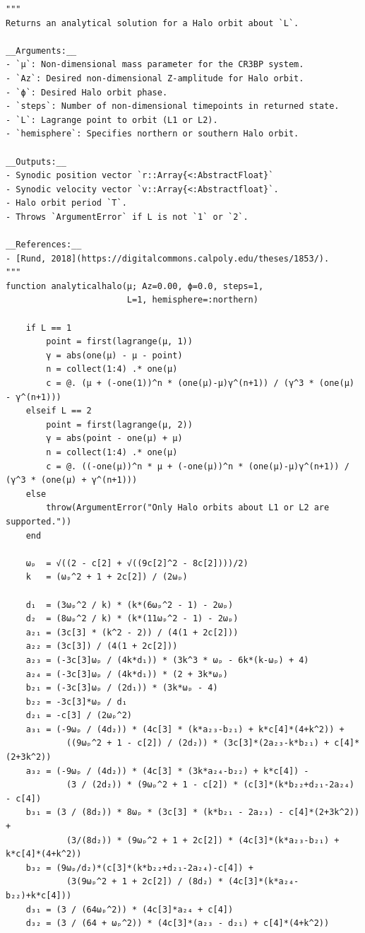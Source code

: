 \documentclass[conf]{new-aiaa}
\begin{document}
\newpage
\begin{verbatim}
"""
Returns an analytical solution for a Halo orbit about `L`.

__Arguments:__ 
- `μ`: Non-dimensional mass parameter for the CR3BP system.
- `Az`: Desired non-dimensional Z-amplitude for Halo orbit.
- `ϕ`: Desired Halo orbit phase.
- `steps`: Number of non-dimensional timepoints in returned state.
- `L`: Lagrange point to orbit (L1 or L2).
- `hemisphere`: Specifies northern or southern Halo orbit.

__Outputs:__
- Synodic position vector `r::Array{<:AbstractFloat}`
- Synodic velocity vector `v::Array{<:Abstractfloat}`.
- Halo orbit period `Τ`.
- Throws `ArgumentError` if L is not `1` or `2`.

__References:__
- [Rund, 2018](https://digitalcommons.calpoly.edu/theses/1853/).
"""
function analyticalhalo(μ; Az=0.00, ϕ=0.0, steps=1,
                        L=1, hemisphere=:northern)

    if L == 1
        point = first(lagrange(μ, 1))
        γ = abs(one(μ) - μ - point)
        n = collect(1:4) .* one(μ)
        c = @. (μ + (-one(1))^n * (one(μ)-μ)γ^(n+1)) / (γ^3 * (one(μ) - γ^(n+1)))
    elseif L == 2
        point = first(lagrange(μ, 2))
        γ = abs(point - one(μ) + μ)
        n = collect(1:4) .* one(μ)
        c = @. ((-one(μ))^n * μ + (-one(μ))^n * (one(μ)-μ)γ^(n+1)) / (γ^3 * (one(μ) + γ^(n+1)))
    else
        throw(ArgumentError("Only Halo orbits about L1 or L2 are supported."))
    end

    ωₚ  = √((2 - c[2] + √((9c[2]^2 - 8c[2])))/2)
    k   = (ωₚ^2 + 1 + 2c[2]) / (2ωₚ)

    d₁  = (3ωₚ^2 / k) * (k*(6ωₚ^2 - 1) - 2ωₚ)
    d₂  = (8ωₚ^2 / k) * (k*(11ωₚ^2 - 1) - 2ωₚ)
    a₂₁ = (3c[3] * (k^2 - 2)) / (4(1 + 2c[2]))
    a₂₂ = (3c[3]) / (4(1 + 2c[2]))
    a₂₃ = (-3c[3]ωₚ / (4k*d₁)) * (3k^3 * ωₚ - 6k*(k-ωₚ) + 4)
    a₂₄ = (-3c[3]ωₚ / (4k*d₁)) * (2 + 3k*ωₚ)
    b₂₁ = (-3c[3]ωₚ / (2d₁)) * (3k*ωₚ - 4)
    b₂₂ = -3c[3]*ωₚ / d₁
    d₂₁ = -c[3] / (2ωₚ^2)
    a₃₁ = (-9ωₚ / (4d₂)) * (4c[3] * (k*a₂₃-b₂₁) + k*c[4]*(4+k^2)) + 
            ((9ωₚ^2 + 1 - c[2]) / (2d₂)) * (3c[3]*(2a₂₃-k*b₂₁) + c[4]*(2+3k^2))
    a₃₂ = (-9ωₚ / (4d₂)) * (4c[3] * (3k*a₂₄-b₂₂) + k*c[4]) -
            (3 / (2d₂)) * (9ωₚ^2 + 1 - c[2]) * (c[3]*(k*b₂₂+d₂₁-2a₂₄) - c[4])
    b₃₁ = (3 / (8d₂)) * 8ωₚ * (3c[3] * (k*b₂₁ - 2a₂₃) - c[4]*(2+3k^2)) + 
            (3/(8d₂)) * (9ωₚ^2 + 1 + 2c[2]) * (4c[3]*(k*a₂₃-b₂₁) + k*c[4]*(4+k^2))
    b₃₂ = (9ωₚ/d₂)*(c[3]*(k*b₂₂+d₂₁-2a₂₄)-c[4]) + 
            (3(9ωₚ^2 + 1 + 2c[2]) / (8d₂) * (4c[3]*(k*a₂₄-b₂₂)+k*c[4]))
    d₃₁ = (3 / (64ωₚ^2)) * (4c[3]*a₂₄ + c[4])
    d₃₂ = (3 / (64 + ωₚ^2)) * (4c[3]*(a₂₃ - d₂₁) + c[4]*(4+k^2))


\end{verbatim}
\end{document}
